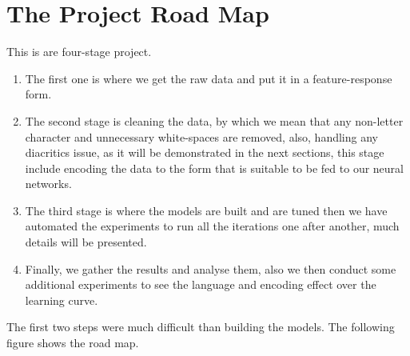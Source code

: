 \documentclass[12pt]{report}
\begin{document}
\section*{The Project Road Map}
This is are four-stage project. 

\begin{enumerate}
    \item The first one is where we get the raw data and put it in a
            feature-response form.
    \item The second stage is cleaning the data, by which we mean that any
            non-letter character and unnecessary white-spaces are removed, also, handling any
            diacritics issue, as it will be demonstrated in the next sections, this stage
            include encoding the data to the form that is suitable to be fed to our neural
            networks.
    \item The third stage is where the models are built and are tuned then we
            have automated the experiments to run all the iterations one after another, much
            details will be presented.
    \item Finally, we gather the results and analyse them, also we then conduct
            some additional experiments to see the language and encoding effect over the
            learning curve.
\end{enumerate}

 

The first two steps were much difficult than
building the models. The following figure shows the road map.

\begin{center}
\end{center}
\end{document}
